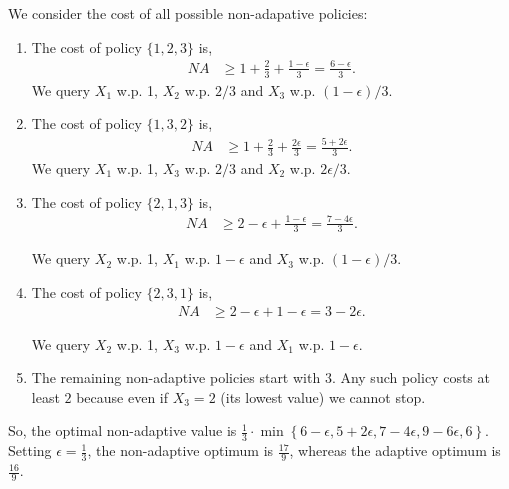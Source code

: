 \documentclass[11pt]{article}
\theoremstyle{remark}
\theoremstyle{plain}
\theoremstyle{remark}
\begin{document}
 We consider the cost of all possible non-adapative policies:
\begin{enumerate}
    \item 
  The cost of policy $\{1,2,3\}$ is,
  \begin{align*}
    NA & \geq 1 + \frac{2}{3} +  \frac{1 - \epsilon}{3} = \frac{6 -  \epsilon}{3} .
\end{align*}
    We query $X_1$ w.p. 1,  $X_2$  w.p. $2/3$ and  $X_3$  w.p. ${(1-\epsilon)}/{3}$.
    


\item 

The cost of policy $\{1,3,2\}$ is,
\begin{align*}
    NA & \geq 1 + \frac{2}{3} + \frac{2\epsilon}{3}  = \frac{5 + 2 \epsilon}{3} .
\end{align*}
    We query  $X_1$  w.p. 1,  $X_3$  w.p. $2/3$ and  $X_2$  w.p. ${2\epsilon}/{3}$.



\item 

The cost of policy $\{2,1,3\}$ is,
\begin{align*}
    NA & \geq 2 - \epsilon + \frac{1-\epsilon}{3} = \frac{7- 4\epsilon}{3}. 
\end{align*}

    We query  $X_2$   w.p. 1,  $X_1$  w.p. $1- \epsilon$ and  $X_3$  w.p. $(1 - \epsilon)/3$.


\item 

The cost of policy $\{2,3,1\}$ is,
\begin{align*}
    NA & \geq 2 - \epsilon + 1 - \epsilon = 3 - 2\epsilon .  
\end{align*}
 
    We query $X_2$ w.p. 1,  $X_3$    w.p. $1- \epsilon$ and  $X_1$ w.p. $1 - \epsilon$.




  
\item  The remaining non-adaptive policies  start with $3$. Any such policy costs at least $2$ because even if $X_3=2$ (its lowest value) we cannot stop.  


\end{enumerate}

So, the optimal non-adaptive value is $\frac13 \cdot \min\left\{ 6-\epsilon , 5+2\epsilon , 7-4\epsilon, 9-6\epsilon, 6\right\}$. Setting   $\epsilon=\frac13$, the non-adaptive optimum is $\frac{17}9$, whereas the adaptive optimum is $\frac{16}{9}$.  
\end{document}
